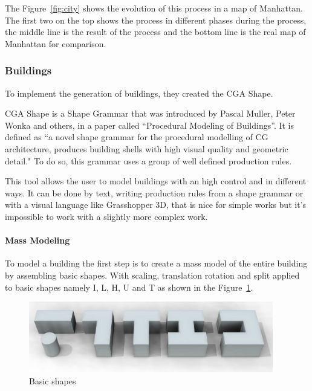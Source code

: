 The Figure~\ref{fig:city} shows the evolution of this process in a map of Manhattan. The first two on the top shows the process in different phases during the process, the middle line is the result of the process and the bottom line is the real map of Manhattan for comparison.


\subsubsection{Buildings} %
\label{ssub:buildings1}

To implement the generation of buildings, they created the CGA Shape.

CGA Shape is a Shape Grammar that was introduced by Pascal Muller, Peter Wonka and others, in a paper called ``Procedural Modeling of Buildings''\cite{Parish2001}. It is defined as ``a novel shape grammar for the procedural modelling of CG architecture, produces building shells with high visual quality and geometric detail." To do so, this grammar uses a group of well defined production rules.

This tool allows the user to model buildings with an high control and in different ways. It can be done by text, writing production rules from a shape grammar or with a visual language like Grasshopper 3D, that is nice for simple works but it's impossible to work with a slightly more complex work. 

\paragraph{Mass Modeling} %
\label{par:mass_modeling}
To model a building the first step is to create a mass model of the entire building by assembling basic shapes. With scaling, translation rotation and split applied to basic shapes namely I, L, H, U and T as shown in the Figure~\ref{fig:basic_shapes}.

\begin{figure}[htbp]
  \centering
  \includegraphics[width=0.95\textwidth]{img/Procedural-Modeling-of-Cities/MassModeling2.png}
  \caption{Basic shapes}
  \label{fig:basic_shapes}
\end{figure}

